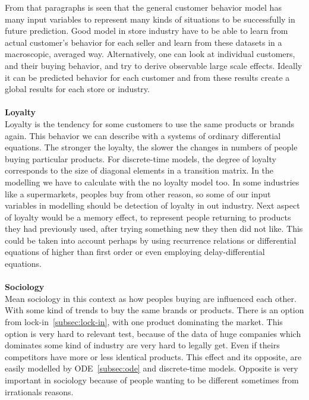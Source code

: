 From that paragraphs is seen that the general customer behavior model has many input variables to represent many kinds
of situations to be successfully in future prediction.
Good model in store industry have to be able to learn from actual customer's behavior for each seller and learn
from these datasets in a macroscopic, averaged way.
Alternatively, one can look at individual customers, and their buying behavior, and try to derive observable large scale effects.
Ideally it can be predicted behavior for each customer and from these results create a global results for each store or industry.\\
\\
\textbf{Loyalty} \label{subsec:loyalty}\\
Loyalty is the tendency for some customers to use the same products or brands again.
This behavior we can describe with a systems of ordinary differential equations.
The stronger the loyalty, the slower the changes in numbers of people buying particular products.
For discrete-time models, the degree of loyalty corresponds to the size of diagonal elements in a transition matrix.
In the modelling we have to calculate with the no loyalty model too.
In some industries like a supermarkets, peoples buy from other reason, so some of our input variables in modelling should be
detection of loyalty in out industry.
Next aspect of loyalty would be a memory effect, to represent people returning to products they had previously used,
after trying something new they then did not like.
This could be taken into account perhaps by using recurrence relations or differential equations of higher than first order or even employing
delay-differential equations.\\
\\
\textbf{Sociology} \label{subsec:sociology}\\
Mean sociology in this context as how peoples buying are influenced each other.
With some kind of trends to buy the same brands or products.
There is an option from lock-in~\ref{subsec:lock-in}, with one product dominating the market.
This option is very hard to relevant test, because of the data of huge companies which dominates some kind
of industry are very hard to legally get.
Even if theirs competitors have more or less identical products.
This effect and its opposite, are easily modelled by ODE~\ref{subsec:ode} and discrete-time models.
Opposite is very important in sociology because of people wanting to be different sometimes from irrationals reasons.

